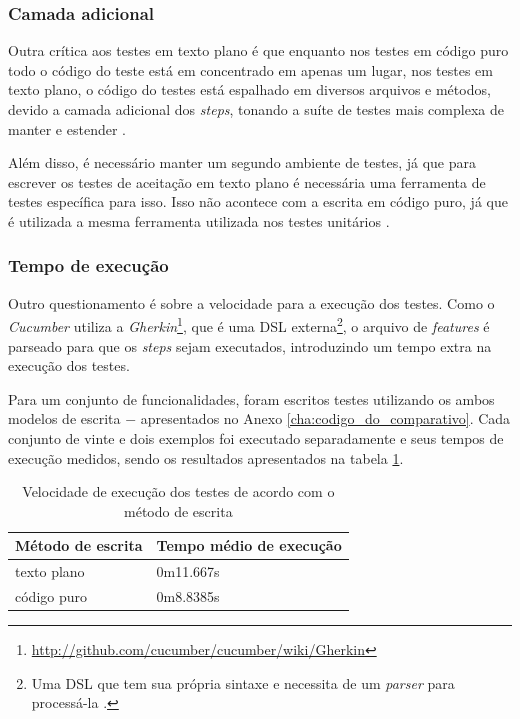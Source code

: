 \subsubsection{Camada adicional}
\label{ssub:camada_adicional}

Outra crítica aos testes em texto plano é que enquanto nos testes em código puro todo o código do teste está em concentrado em apenas um lugar, nos testes em texto plano, o código do testes está espalhado em diversos arquivos e métodos, devido a camada adicional dos \textit{steps}, tonando a suíte de testes mais complexa de manter e estender \cite{SteakOverCucumber}.

Além disso, é necessário manter um segundo ambiente de testes, já que para escrever os testes de aceitação em texto plano é necessária uma ferramenta de testes específica para isso. Isso não acontece com a escrita em código puro, já que é utilizada a mesma ferramenta utilizada nos testes unitários \cite{WhyBotherWithCucumberTesting}.


\subsubsection{Tempo de execução}
\label{ssub:tempo_de_execucao}

Outro questionamento é sobre a velocidade para a execução dos testes. Como o \textit{Cucumber} utiliza a \textit{Gherkin}\footnote{\url{http://github.com/cucumber/cucumber/wiki/Gherkin}}, que é uma DSL externa\footnote{Uma DSL que tem sua própria sintaxe e necessita de um \textit{parser} para processá-la \cite{DSLFowler}.}, o arquivo de \textit{features} é parseado para que os \textit{steps} sejam executados, introduzindo um tempo extra na execução dos testes.

Para um conjunto de funcionalidades, foram escritos testes utilizando os ambos modelos de escrita $-$ apresentados no Anexo \ref{cha:codigo_do_comparativo}. Cada conjunto de vinte e dois exemplos foi executado separadamente e seus tempos de execução medidos, sendo os resultados apresentados na tabela \ref{table:tempo_de_execucao}.

\begin{table}[ht]
\caption{Velocidade de execução dos testes de acordo com o método de escrita}
\label{table:tempo_de_execucao}
\centering
\begin{tabular}{p{4.5cm} p{6.5cm}}
\toprule
\textbf{Método de escrita} & \textbf{Tempo médio de execução} \\
\midrule[1pt]
texto plano & 0m11.667s \\ \midrule
código puro & 0m8.8385s \\
\bottomrule
\end{tabular}
\end{table}

